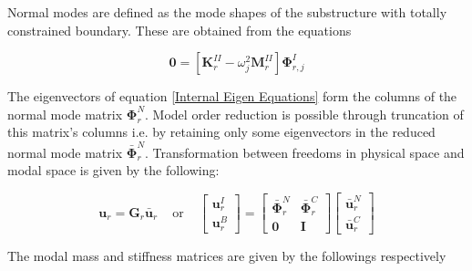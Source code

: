 \documentclass[../DomainDecomposition.tex]{subfiles}
\begin{document}
Normal modes are defined as the mode shapes of the substructure with totally constrained boundary. 
These are obtained from the equations 

\begin{equation}
    \mathbf{0} 
    = 
    \left[
        \mathbf{K}_{r}^{II} - 
        \omega_{j}^{2} \mathbf{M}_{r}^{II} 
    \right]
    \mathbf{\Phi}_{r,j}^{I}
    \label{Internal Eigen Equations}
\end{equation}

The eigenvectors of equation \eqref{Internal Eigen Equations} form the columns of the normal mode matrix $\mathbf{\Phi}_{r}^{N}$. 
Model order reduction is possible through truncation of this matrix's columns i.e. by retaining only some eigenvectors in the reduced normal mode matrix $\bar{\mathbf{\Phi}}_{r}^{N}$. 
Transformation between freedoms in physical space and modal space is given by the following: 

\begin{equation}
    \mathbf{u}_{r} 
    = 
    \mathbf{G}_{r} 
    \bar{\mathbf{u}}_{r}
    \phantom{xx} 
    \text{or} 
    \phantom{xx} 
    \begin{bmatrix}
        \mathbf{u}_{r}^{I} \\
        \mathbf{u}_{r}^{B} 
    \end{bmatrix}
    =
    \begin{bmatrix}
        \bar{\mathbf{\Phi}}_{r}^{N} &
        \bar{\mathbf{\Phi}}_{r}^{C} \\ 
        \mathbf{0} & 
        \mathbf{I} 
    \end{bmatrix}
    \begin{bmatrix}
        \bar{\mathbf{u}}_{r}^{N} \\ 
        \bar{\mathbf{u}}_{r}^{C}
    \end{bmatrix}
\end{equation}

The modal mass and stiffness matrices are given by the followings respectively 
\end{document}

